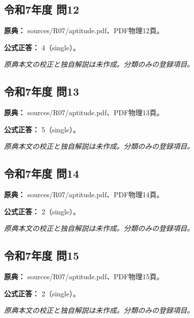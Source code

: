 \subsection{令和7年度 問12}
\label{q:r07-reg-apt-12}

\noindent\textbf{原典：} sources/R07/aptitude.pdf、PDF物理12頁。

\textbf{公式正答：} 4（single）。

\par\textit{原典本文の校正と独自解説は未作成。分類のみの登録項目。}

\subsection{令和7年度 問13}
\label{q:r07-reg-apt-13}

\noindent\textbf{原典：} sources/R07/aptitude.pdf、PDF物理13頁。

\textbf{公式正答：} 5（single）。

\par\textit{原典本文の校正と独自解説は未作成。分類のみの登録項目。}

\subsection{令和7年度 問14}
\label{q:r07-reg-apt-14}

\noindent\textbf{原典：} sources/R07/aptitude.pdf、PDF物理14頁。

\textbf{公式正答：} 2（single）。

\par\textit{原典本文の校正と独自解説は未作成。分類のみの登録項目。}

\subsection{令和7年度 問15}
\label{q:r07-reg-apt-15}

\noindent\textbf{原典：} sources/R07/aptitude.pdf、PDF物理15頁。

\textbf{公式正答：} 2（single）。

\par\textit{原典本文の校正と独自解説は未作成。分類のみの登録項目。}

